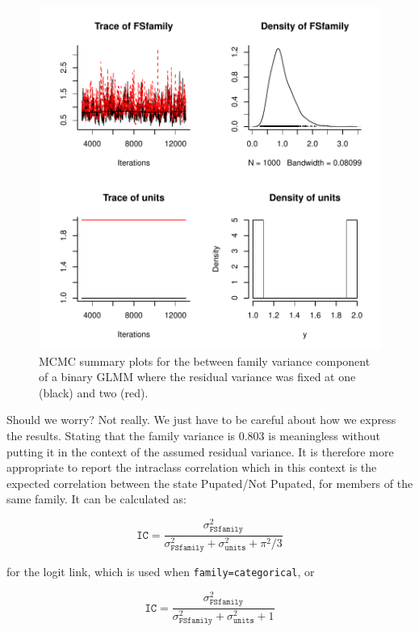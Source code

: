 \documentclass{article}
\begin{document}
\begin{figure}[!h]
\begin{center}
\includegraphics{Lecture2-068}
\end{center}
\caption{MCMC summary plots for the between family variance component of a binary GLMM where the residual variance was fixed at one (black) and two (red).}
\label{Bin2-fig}
\end{figure}

Should we worry? Not really. We just have to be careful about how we express the results. Stating that the family variance is 0.803 is meaningless without putting it in the context of the assumed residual variance. It is therefore more appropriate to report the intraclass correlation which in this context is the expected correlation between the state Pupated/Not Pupated, for members of the same family. It can be calculated as:

\begin{equation}
\texttt{IC} =  \frac{\sigma^{2}_{\texttt{FSfamily}}}{\sigma^{2}_{\texttt{FSfamily}}+\sigma^{2}_{\texttt{units}}+\pi^{2}/3} 
\end{equation} 

for the logit link, which is used when \texttt{family=categorical}, or 

\begin{equation}
\texttt{IC} =  \frac{\sigma^{2}_{\texttt{FSfamily}}}{\sigma^{2}_{\texttt{FSfamily}}+\sigma^{2}_{\texttt{units}}+1} 
\end{equation} 
\end{document}

